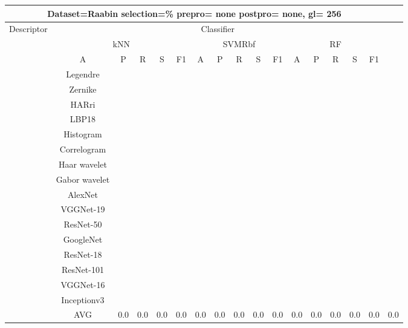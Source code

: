 \documentclass[12pt,italian]{article}
\begin{document}
\begin{tiny}
 \pagebreak 
\begin{longtable}{lcccccccccccccccc}
\toprule
\multicolumn{16}{c}{Dataset=Raabin selection=\% prepro= none postpro= none, gl= 256} \\ 
\toprule
Descriptor & \multicolumn{15}{c}{Classifier} \\ 
& \multicolumn{5}{c}{kNN} & \multicolumn{5}{c}{SVMRbf} & \multicolumn{5}{c}{RF} \\ 
& A & P & R & S & F1 & A & P & R & S & F1 & A & P & R & S & F1 \\ 
\midrule
& Legendre \\ 
& Zernike \\ 
& HARri \\ 
& LBP18 \\ 
& Histogram \\ 
& Correlogram \\ 
& Haar wavelet \\ 
& Gabor wavelet \\ 
& AlexNet \\ 
& VGGNet-19 \\ 
& ResNet-50 \\ 
& GoogleNet \\ 
& ResNet-18 \\ 
& ResNet-101 \\ 
& VGGNet-16 \\ 
& Inceptionv3 \\ 
\hline
& AVG &  0.0 &  0.0 &  0.0 &  0.0 &  0.0 &  0.0 &  0.0 &  0.0 &  0.0 &  0.0 &  0.0 &  0.0 &  0.0 &  0.0 &  0.0 \\ 
\hline
\bottomrule
\end{longtable} 

 \pagebreak 
\end{tiny} 
 
\end{document}

